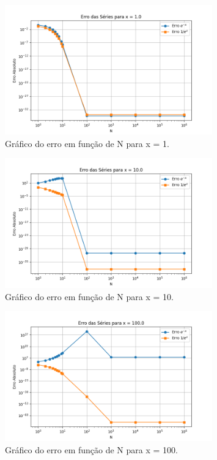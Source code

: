 \documentclass[12pt, a4paper]{article} %
\begin{document}
    \begin{figure}[H]
        \centering
        \includegraphics[width=0.8\textwidth]{../images/erro_x_1_0.png}
        \caption{Gr\'afico do erro em fun\c{c}\~ao de N para x = 1.}
    \end{figure}

    \begin{figure}[H]
        \centering
        \includegraphics[width=0.8\textwidth]{../images/erro_x_10_0.png}
        \caption{Gr\'afico do erro em fun\c{c}\~ao de N para x = 10.}
    \end{figure}

    \begin{figure}[H]
        \centering
        \includegraphics[width=0.8\textwidth]{../images/erro_x_100_0.png}
        \caption{Gr\'afico do erro em fun\c{c}\~ao de N para x = 100.}
    \end{figure}
\end{document}

